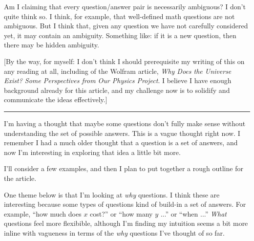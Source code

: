 \documentclass[11pt, oneside]{article}   	%
\begin{document}
Am I claiming that every question/answer pair is necessarily ambiguous? I don't
quite think so. I think, for example, that well-defined math questions are not
ambiguous. But I think that, given any question we have not carefully considered
yet, it may contain an ambiguity. Something like: if it is a new question, then
there may be hidden ambiguity.

[By the way, for myself: I don't think I should prerequisite my writing of this
on any reading at all, including of the Wolfram article, {\em Why Does the
Universe Exist? Some Perspectives from Our Physics Project}. I believe I have
enough background already for this article, and my challenge now is to solidify
and communicate the ideas effectively.]

\bigskip
\hrule
\bigskip

I'm having a thought that maybe some questions don't fully make sense without
understanding the set of possible answers. This is a vague thought right now. I
remember I had a much older thought that a question is a set of answers, and now
I'm interesting in exploring that idea a little bit more.

I'll consider a few examples, and then I plan to put together a rough outline
for the article.

One theme below is that I'm looking at {\em why} questions. I think these are
interesting because some types of questions kind of build-in a set of answers.
For example, ``how much does $x$ cost?'' or ``how many $y$ ...'' or ``when ...''
{\em What} questions feel more flexibible, although I'm finding my intuition
seems a bit more inline with vagueness in terms of the {\em why} questions I've
thought of so far.
\end{document}
